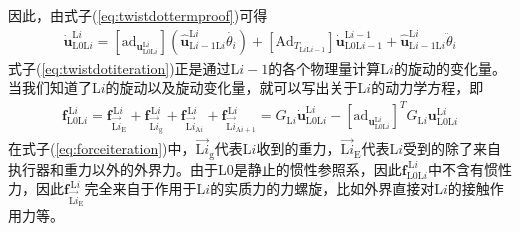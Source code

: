 \documentclass[12pt, a4paper, article, UTF8]{ctexart}
\begin{document}
因此，由式子(\ref{eq:twistdottermproof})可得
\begin{align}
\dot{\mathbf{u}}_{\text{L}0\text{L}i}^{\text{L}i} = [\text{ad}_{\mathbf{u}_{\text{L}0\text{L}i}^{\text{L}i} }] (\hat{\mathbf{u}}_{\text{L}i-1\text{L}i}^{\text{L}i}\dot{\theta_i}) + [\text{Ad}_{T_{\text{L}i\text{L}i-1}}]\dot{\mathbf{u}}_{\text{L}0\text{L}i-1}^{\text{L}i-1} + \hat{\mathbf{u}}_{\text{L}i-1\text{L}i}^{\text{L}i}\ddot{\theta}_{i} \label{eq:twistdotiteration}
\end{align}
式子(\ref{eq:twistdotiteration})正是通过L$i-1$的各个物理量计算L$i$的旋动的变化量。当我们知道了L$i$的旋动以及旋动变化量，就可以写出关于L$i$的动力学方程，即
\begin{align}
\mathbf{f}_{\text{L}0\text{L}i}^{\,\text{L}i} = \mathbf{f}_{\vec{\text{L}i}_{\text{E}}}^{\,\text{L}i} +  \mathbf{f}_{\vec{\text{L}i}_{\text{g}}}^{\,\text{L}i} + \mathbf{f}^{\,\text{L}i}_{\vec{\text{L}i}_{\text{A}i}} + \mathbf{f}^{\,\text{L}i}_{\vec{\text{L}i}_{\text{A}i+1}} = G_{\text{L}i} \dot{\mathbf{u}}_{\text{L}0\text{L}i}^{\text{L}i} - [\text{ad}_{\mathbf{u}_{\text{L}0\text{L}i}^{\text{L}i}}]^T G_{\text{L}i} \mathbf{u}_{\text{L}0\text{L}i}^{\text{L}i} \label{eq:forceiteration}
\end{align}
在式子(\ref{eq:forceiteration})中，$\vec{\text{L}i}_{\text{g}}$代表L$i$收到的重力，$\vec{\text{L}i}_{\text{E}}$代表L$i$受到的除了来自执行器和重力以外的外界力。由于L$0$是静止的惯性参照系，因此$\mathbf{f}_{\text{L}0\text{L}i}^{\,\text{L}i}$中不含有惯性力，因此$ \mathbf{f}_{\vec{\text{L}i}_{\text{E}}}^{\,\text{L}i}$完全来自于作用于L$i$的实质力的力螺旋，比如外界直接对L$i$的接触作用力等。
\end{document}
